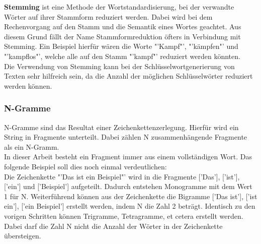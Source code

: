 			\textbf{Stemming} ist eine Methode der Wortstandardisierung, bei der verwandte Wörter auf ihrer Stammform reduziert werden. Dabei wird bei dem Rechenvorgang auf den Stamm und die Semantik eines Wortes geachtet. Aus diesem Grund fällt der Name Stammformreduktion öfters in Verbindung mit Stemming.\cite{eldesouki2009stemming} Ein Beispiel hierfür wären die Worte "'Kampf"', "'kämpfen"' und "'kampflos"', welche alle auf den Stamm "'kampf"' reduziert werden könnten.\\ 
			Die Verwendung von Stemming kann bei der Schlüsselwortgenerierung von Texten sehr hilfreich sein, da die Anzahl der möglichen Schlüsselwörter reduziert werden können.
		\subsubsection{N-Gramme}
		N-Gramme sind das Resultat einer Zeichenkettenzerlegung. Hierfür wird ein String in Fragmente unterteilt. Dabei zählen N zusammenhängende Fragmente als ein N-Gramm. \cite{cavnar1994n}\\
		In dieser Arbeit besteht ein Fragment immer aus einem vollständigen Wort. Das folgende Beispiel soll dies noch einmal verdeutlichen:\\
		Die Zeichenkette "'Das ist ein Beispiel"' wird in die Fragmente ['Das'], ['ist'], ['ein'] und ['Beispiel'] aufgeteilt. Dadurch entstehen Monogramme mit dem Wert 1 für N. Weiterführend können aus der Zeichenkette die Bigramme ['Das ist'], ['ist ein'], ['ein Beispiel'] erstellt werden, indem N die Zahl 2 beträgt. Identisch zu den vorigen Schritten können Trigramme, Tetragramme, et cetera erstellt werden. Dabei darf die Zahl N nicht die Anzahl der Wörter in der Zeichenkette übersteigen.


